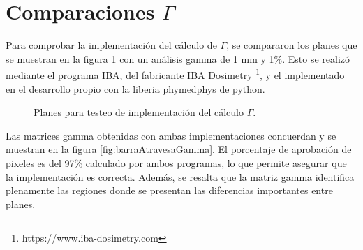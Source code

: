 \section{Comparaciones $\Gamma$}

Para comprobar la implementación del cálculo de $\Gamma$, se compararon los planes que se muestran en la figura \ref{fig:barraAtravesa} con un análisis gamma de 1 mm y 1\%. Esto se realizó mediante el programa IBA, del fabricante IBA Dosimetry \footnote{https://www.iba-dosimetry.com}, y el implementado en el desarrollo propio con la liberia phymedphys de python.

\begin{figure}[H]
	\centering
	\hfill
	\caption{Planes para testeo de implementación del cálculo $\Gamma$.}
	\label{fig:barraAtravesa}
\end{figure}

Las matrices gamma obtenidas con ambas implementaciones concuerdan y se muestran en la figura \ref{fig:barraAtravesaGamma}. El porcentaje de aprobación de pixeles es del 97\% calculado por ambos programas, lo que permite asegurar que la implementación es correcta. Además, se resalta que la matriz gamma identifica plenamente las regiones donde se presentan las diferencias importantes entre planes. 

